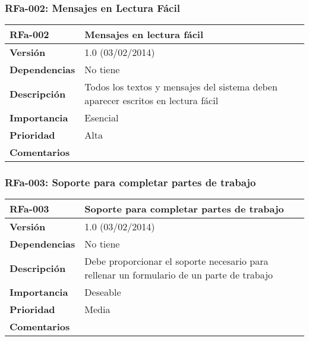 \subsubsection*{RFa-002: Mensajes en Lectura Fácil}
\begin{tabular}{|p{3cm}|p{11.5cm}|}
\hline
\textbf{RFa-002}        & \textbf{Mensajes en lectura fácil}                                                                         \\ \hline
\textbf{Versión}        & 1.0 (03/02/2014)                                                                                           \\ \hline
\textbf{Dependencias}   & No tiene                                                                                                   \\ \hline
\textbf{Descripción}    & Todos los textos y mensajes del sistema deben aparecer escritos en lectura fácil                           \\ \hline
\textbf{Importancia}    & Esencial                                                                                                   \\ \hline
\textbf{Prioridad}      & Alta                                                                                                       \\ \hline
\textbf{Comentarios}    &                                                                                                            \\ \hline
\end{tabular}

\subsubsection*{RFa-003: Soporte para completar partes de trabajo}
\begin{tabular}{|p{3cm}|p{11.5cm}|}
\hline
\textbf{RFa-003}        & \textbf{Soporte para completar partes de trabajo}                                                          \\ \hline
\textbf{Versión}        & 1.0 (03/02/2014)                                                                                           \\ \hline
\textbf{Dependencias}   & No tiene                                                                                                   \\ \hline
\textbf{Descripción}    & Debe proporcionar el soporte necesario para rellenar un formulario de un parte de trabajo                  \\ \hline
\textbf{Importancia}    & Deseable                                                                                                   \\ \hline
\textbf{Prioridad}      & Media                                                                                                      \\ \hline
\textbf{Comentarios}    &                                                                                                            \\ \hline
\end{tabular}

